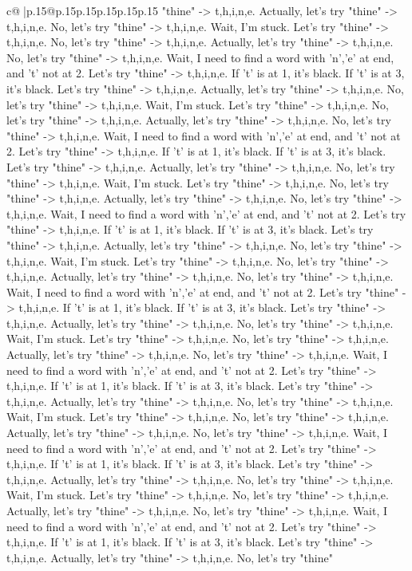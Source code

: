 \documentclass{article}
\begin{document}
{\begin{supertabular}{c@{$\;$}|p{.15\linewidth}@{}p{.15\linewidth}p{.15\linewidth}p{.15\linewidth}p{.15\linewidth}p{.15\linewidth}}
{{{"thine" {-}> t,h,i,n,e. Actually, let's try "thine" {-}> t,h,i,n,e. No, let's try "thine" {-}> t,h,i,n,e. Wait, I'm stuck. Let's try "thine" {-}> t,h,i,n,e. No, let's try "thine" {-}> t,h,i,n,e. Actually, let's try "thine" {-}> t,h,i,n,e. No, let's try "thine" {-}> t,h,i,n,e. Wait, I need to find a word with 'n','e' at end, and 't' not at 2. Let's try "thine" {-}> t,h,i,n,e. If 't' is at 1, it's black. If 't' is at 3, it's black. Let's try "thine" {-}> t,h,i,n,e. Actually, let's try "thine" {-}> t,h,i,n,e. No, let's try "thine" {-}> t,h,i,n,e. Wait, I'm stuck. Let's try "thine" {-}> t,h,i,n,e. No, let's try "thine" {-}> t,h,i,n,e. Actually, let's try "thine" {-}> t,h,i,n,e. No, let's try "thine" {-}> t,h,i,n,e. Wait, I need to find a word with 'n','e' at end, and 't' not at 2. Let's try "thine" {-}> t,h,i,n,e. If 't' is at 1, it's black. If 't' is at 3, it's black. Let's try "thine" {-}> t,h,i,n,e. Actually, let's try "thine" {-}> t,h,i,n,e. No, let's try "thine" {-}> t,h,i,n,e. Wait, I'm stuck. Let's try "thine" {-}> t,h,i,n,e. No, let's try "thine" {-}> t,h,i,n,e. Actually, let's try "thine" {-}> t,h,i,n,e. No, let's try "thine" {-}> t,h,i,n,e. Wait, I need to find a word with 'n','e' at end, and 't' not at 2. Let's try "thine" {-}> t,h,i,n,e. If 't' is at 1, it's black. If 't' is at 3, it's black. Let's try "thine" {-}> t,h,i,n,e. Actually, let's try "thine" {-}> t,h,i,n,e. No, let's try "thine" {-}> t,h,i,n,e. Wait, I'm stuck. Let's try "thine" {-}> t,h,i,n,e. No, let's try "thine" {-}> t,h,i,n,e. Actually, let's try "thine" {-}> t,h,i,n,e. No, let's try "thine" {-}> t,h,i,n,e. Wait, I need to find a word with 'n','e' at end, and 't' not at 2. Let's try "thine" {-}> t,h,i,n,e. If 't' is at 1, it's black. If 't' is at 3, it's black. Let's try "thine" {-}> t,h,i,n,e. Actually, let's try "thine" {-}> t,h,i,n,e. No, let's try "thine" {-}> t,h,i,n,e. Wait, I'm stuck. Let's try "thine" {-}> t,h,i,n,e. No, let's try "thine" {-}> t,h,i,n,e. Actually, let's try "thine" {-}> t,h,i,n,e. No, let's try "thine" {-}> t,h,i,n,e. Wait, I need to find a word with 'n','e' at end, and 't' not at 2. Let's try "thine" {-}> t,h,i,n,e. If 't' is at 1, it's black. If 't' is at 3, it's black. Let's try "thine" {-}> t,h,i,n,e. Actually, let's try "thine" {-}> t,h,i,n,e. No, let's try "thine" {-}> t,h,i,n,e. Wait, I'm stuck. Let's try "thine" {-}> t,h,i,n,e. No, let's try "thine" {-}> t,h,i,n,e. Actually, let's try "thine" {-}> t,h,i,n,e. No, let's try "thine" {-}> t,h,i,n,e. Wait, I need to find a word with 'n','e' at end, and 't' not at 2. Let's try "thine" {-}> t,h,i,n,e. If 't' is at 1, it's black. If 't' is at 3, it's black. Let's try "thine" {-}> t,h,i,n,e. Actually, let's try "thine" {-}> t,h,i,n,e. No, let's try "thine" {-}> t,h,i,n,e. Wait, I'm stuck. Let's try "thine" {-}> t,h,i,n,e. No, let's try "thine" {-}> t,h,i,n,e. Actually, let's try "thine" {-}> t,h,i,n,e. No, let's try "thine" {-}> t,h,i,n,e. Wait, I need to find a word with 'n','e' at end, and 't' not at 2. Let's try "thine" {-}> t,h,i,n,e. If 't' is at 1, it's black. If 't' is at 3, it's black. Let's try "thine" {-}> t,h,i,n,e. Actually, let's try "thine" {-}> t,h,i,n,e. No, let's try "thine" }}}
\end{supertabular}}
\end{document}
